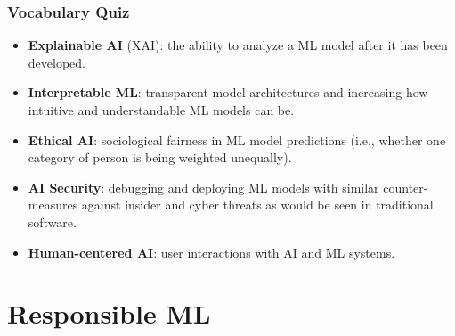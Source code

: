 \documentclass[11pt,
               aspectratio=169,
               hyperref={colorlinks}
               ]{beamer}
\begin{document}

	\begin{frame}
		
		\frametitle{Vocabulary Quiz}
		
		\begin{itemize}
			\item \textbf{Explainable AI} (XAI): the ability to analyze a ML model after it has been developed. 
			\item \textbf{Interpretable ML}: transparent model architectures and increasing how intuitive and understandable ML models can be.
			\item \textbf{Ethical AI}: sociological fairness in ML model predictions (i.e., whether one category of person is being weighted unequally). 
			\item \textbf{AI Security}: debugging and deploying ML models with similar counter-measures against insider and cyber threats as would be seen in traditional software.
			\item \textbf{Human-centered AI}: user interactions with AI and ML systems.		
		\end{itemize}
		
	\end{frame}


	\section{Responsible ML}

\end{document}

